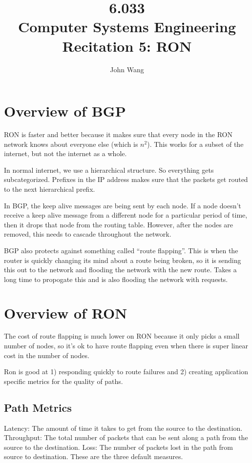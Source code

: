 \documentclass[psamsfonts]{amsart}
\title{6.033 \\
Computer Systems Engineering \\
Recitation 5: RON}
\author{John Wang}
\begin{document}
\maketitle

\section{Overview of BGP}

RON is faster and better because it makes sure that every node in the RON network knows about everyone else (which is $n^2$). This works for a subset of the internet, but not the internet as a whole.

In normal internet, we use a hierarchical structure. So everything gets subcategorized. Prefixes in the IP address makes sure that the packets get routed to the next hierarchical prefix.

In BGP, the keep alive messages are being sent by each node. If a node doesn't receive a keep alive message from a different node for a particular period of time, then it drops that node from the routing table. However, after the nodes are removed, this needs to cascade throughout the network.

BGP also protects against something called ``route flapping''. This is when the router is quickly changing its mind about a route being broken, so it is sending this out to the network and flooding the network with the new route. Takes a long time to propogate this and is also flooding the network with requests.

\section{Overview of RON}

The cost of route flapping is much lower on RON because it only picks a small number of nodes, so it's ok to have route flapping even when there is super linear cost in the number of nodes.

Ron is good at 1) responding quickly to route failures and 2) creating application specific metrics for the quality of paths.

\subsection{Path Metrics}

Latency: The amount of time it takes to get from the source to the destination. Throughput: The total number of packets that can be sent along a path from the source to the destination. Loss: The number of packets lost in the path from source to destination. These are the three default measures.
\end{document}
